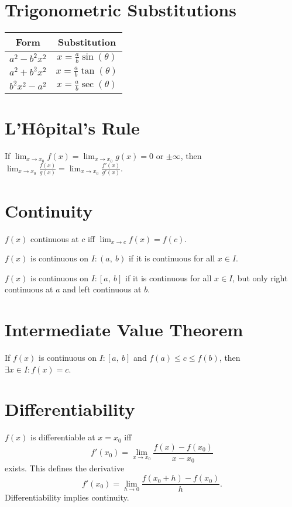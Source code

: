 \documentclass{article}
\begin{document}
\begin{multicols}{3}
    \section*{Trigonometric Substitutions}
    \begin{table}[H]
        \centering
        \begin{tabular}{c c}
            \toprule
            \textbf{Form}  & \textbf{Substitution}                        \\
            \midrule
            \(a^2-b^2x^2\) & \(x=\frac{a}{b}\sin{\left( \theta \right)}\) \\
            \(a^2+b^2x^2\) & \(x=\frac{a}{b}\tan{\left( \theta \right)}\) \\
            \(b^2x^2-a^2\) & \(x=\frac{a}{b}\sec{\left( \theta \right)}\) \\
            \bottomrule
        \end{tabular}
    \end{table}
    \section*{L'Hôpital's Rule}
    If \(\displaystyle \lim_{x\to x_0}f\left( x \right)=\lim_{x\to x_0}g\left( x \right)=0\) or \(\pm\infty\), then
    \(\displaystyle \lim_{x\to x_0}\frac{f\left( x \right)}{g\left( x \right)} = \lim_{x\to x_0}\frac{f'\left( x \right)}{g'\left( x \right)}\).
    \section*{Continuity}
    \(f\left( x \right)\) continuous at \(c\) iff \(\displaystyle \lim_{x\to c} f\left( x \right) = f\left( c \right)\).

    \(f\left( x \right)\) is continuous on \(I:\left( a,\:b \right)\) if it is continuous
    for all \(x\in I\).

    \(f\left( x \right)\) is continuous on \(I:\left[ a,\:b \right]\) if it is continuous
    for all \(x\in I\), but only right continuous at \(a\) and left continuous at \(b\).
    \section*{Intermediate Value Theorem}
    If \(f\left( x \right)\) is continuous on \(I:\left[ a, \: b \right]\) and \(f\left( a \right) \leq c \leq f\left( b \right)\), then \(\exists x\in I:f\left( x \right)=c\).
    \section*{Differentiability}
    \(f\left( x \right)\) is differentiable at \(x=x_0\) iff
    \begin{equation*}
        f'\left( x_0 \right) = \lim_{x\to x_0} \frac{f\left( x \right)-f\left( x_0 \right)}{x-x_0}
    \end{equation*}
    exists. This defines the derivative
    \begin{equation*}
        f'\left( x_0 \right) = \lim_{h\to 0} \frac{f\left( x_0+h \right)-f\left( x_0 \right)}{h}.
    \end{equation*}
    Differentiability implies continuity.

\end{multicols}
\end{document}
